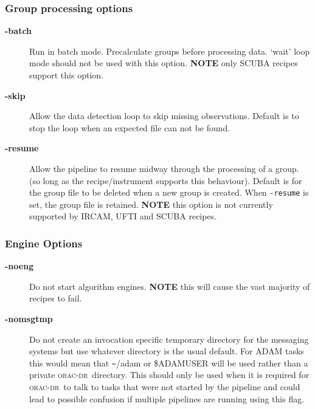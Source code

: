 \documentclass[twoside,11pt]{article}
\renewcommand{\_}{\texttt{\symbol{95}}}
\newcommand{\oracdr}{\textsc{orac-dr}}
\begin{document}
\subsubsection*{Group processing options\label{oracdr_Group_processing_options}}\begin{description}
\item[\textbf{-batch}] \mbox{}

Run in batch mode. Precalculate groups before processing
data. `wait' loop mode should not be used with this option.
\textbf{NOTE} only SCUBA recipes support this option.

\item[\textbf{-skip}] \mbox{}

Allow the data detection loop to skip missing observations.
Default is to stop the loop when an expected file can not be found.

\item[\textbf{-resume}] \mbox{}

Allow the pipeline to resume midway through the processing
of a group. (so long as the recipe/instrument supports
this behaviour). Default is for the group file to be deleted
when a new group is created. When \texttt{-resume} is set, the group
file is retained. \textbf{NOTE} this option is not currently supported by
IRCAM, UFTI and SCUBA recipes.

\end{description}
\subsubsection*{Engine Options\label{oracdr_Engine_Options}}\begin{description}
\item[\textbf{-noeng}] \mbox{}

Do not start algorithm engines. \textbf{NOTE} this will cause
the vast majority of recipes to fail.

\item[\textbf{-nomsgtmp}] \mbox{}

Do not create an invocation specific temporary directory for the
messaging systems but use whatever directory is the usual default. For
ADAM tasks this would mean that \texttt{\~{}}/adam or \$ADAM\_USER will be used
rather than a private \oracdr\ directory. This should only be used when
it is required for \oracdr\ to talk to tasks that were not started by
the pipeline and could lead to possible confusion if multiple
pipelines are running using this flag.

\end{description}
\end{document}
